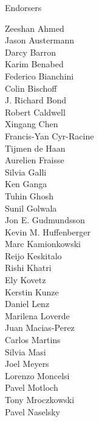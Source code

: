 \documentclass[PICOReport.tex]{subfiles}
\begin{document}
{\Large { \centerline {Endorsers}}

\footnotesize {

\begin{multicols}{4}
Zeeshan Ahmed                   \\
Jason Austermann                \\
Darcy Barron                    \\
Karim Benabed                   \\
Federico Bianchini              \\
Colin Bischoff                  \\
J. Richard Bond                 \\
Robert Caldwell                 \\
Xingang Chen                    \\
Francis-Yan Cyr-Racine          \\
Tijmen de Haan                  \\
Aurelien Fraisse                \\
Silvia Galli                    \\
Ken Ganga                       \\
Tuhin Ghosh                     \\
Sunil Golwala                   \\
Jon E. Gudmundsson              \\
Kevin M. Huffenberger           \\
Marc Kamionkowski               \\
Reijo Keskitalo                 \\
Rishi Khatri                    \\
Ely Kovetz                      \\
Kerstin Kunze                   \\
Daniel Lenz                     \\
Marilena Loverde                \\
Juan Macias-Perez               \\
Carlos Martins                  \\
Silvia Masi                     \\
Joel Meyers                     \\
Lorenzo Moncelsi                \\
Pavel Motloch                   \\
Tony Mroczkowski                \\
Pavel Naselsky                  \\

\end{multicols}}}
\end{document}
